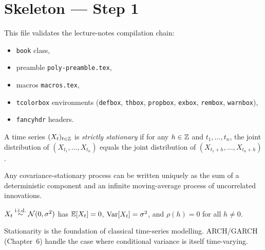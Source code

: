 \documentclass[a4paper,11pt,oneside]{book}
\title{\moduleNom}
\author{\auteurNom\\\auteurEmail\\\auteurInstitution}
\date{\anneeUniversitaire}
\begin{document}
\frontmatter
\maketitle
\tableofcontents

\mainmatter

\chapter*{Skeleton --- Step 1}

This file validates the lecture-notes compilation chain:
\begin{itemize}
  \item \texttt{book} class,
  \item preamble \texttt{poly-preamble.tex},
  \item macros \texttt{macros.tex},
  \item \texttt{tcolorbox} environments
        (\texttt{defbox}, \texttt{thbox}, \texttt{propbox},
         \texttt{exbox}, \texttt{rembox}, \texttt{warnbox}),
  \item \texttt{fancyhdr} headers.
\end{itemize}

\begin{defbox}[Stationarity]
A time series $(X_t)_{t \in \mathbb{Z}}$ is \emph{strictly stationary} if for any
$h \in \mathbb{Z}$ and $t_1, \dots, t_n$, the joint distribution of
$(X_{t_1}, \dots, X_{t_n})$ equals the joint distribution of
$(X_{t_1+h}, \dots, X_{t_n+h})$.
\end{defbox}

\begin{thbox}
Any covariance-stationary process can be written uniquely as the sum
of a deterministic component and an infinite moving-average process
of uncorrelated innovations.
\end{thbox}

\begin{exbox}
$X_t \overset{\text{i.i.d.}}{\sim} \mathcal{N}(0, \sigma^2)$ has $\mathbb{E}[X_t] = 0$, $\mathrm{Var}[X_t] = \sigma^2$,
and $\rho(h) = 0$ for all $h \neq 0$.
\end{exbox}

\begin{rembox}
Stationarity is the foundation of classical time-series modelling.
ARCH/GARCH (Chapter~6) handle the case where conditional variance is
itself time-varying.
\end{rembox}
\end{document}
